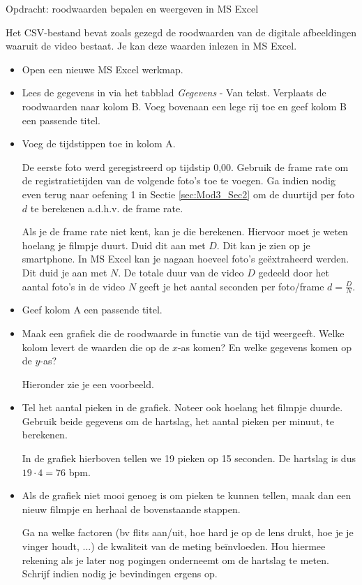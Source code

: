 \begin{opdracht}{Opdracht: roodwaarden bepalen en weergeven in MS Excel}
\begin{enumerate}
	Het CSV-bestand bevat zoals gezegd de roodwaarden van de digitale afbeeldingen waaruit de video bestaat. Je kan deze waarden inlezen in MS Excel. 
	
	\begin{itemize}
		\item Open een nieuwe MS Excel werkmap.
		\item Lees de gegevens in via het tabblad \emph{Gegevens} - Van tekst. Verplaats de roodwaarden naar kolom B. Voeg bovenaan een lege rij toe en geef kolom B een passende titel.
		\item Voeg de tijdstippen toe in kolom A. 
		
		De eerste foto werd geregistreerd op tijdstip 0,00. Gebruik de frame rate om de registratietijden van de volgende foto's toe te voegen. Ga indien nodig even terug naar oefening 1 in Sectie \ref{sec:Mod3_Sec2} om de duurtijd per foto $d$ te berekenen a.d.h.v. de frame rate.
		
		Als je de frame rate niet kent, kan je die berekenen. Hiervoor moet je weten hoelang je filmpje duurt. Duid dit aan met $D$. Dit kan je zien op je smartphone. In MS Excel kan je nagaan hoeveel foto's ge\"extraheerd werden. Dit duid je aan met $N$. De totale duur van de video $D$ gedeeld door het aantal foto's in de video $N$ geeft je het aantal seconden per foto/frame $d=\frac{D}{N}$. 
		
		\item Geef kolom A een passende titel.
		
		\item Maak een grafiek die de roodwaarde in functie van de tijd weergeeft. Welke kolom levert de waarden die op de $x$-as komen? En welke gegevens komen op de $y$-as?
		
		Hieronder zie je een voorbeeld.
		
		
		\item Tel het aantal pieken in de grafiek. Noteer ook hoelang het filmpje duurde. Gebruik beide gegevens om de hartslag, het aantal pieken per minuut, te berekenen.
		
		In de grafiek hierboven tellen we 19 pieken op 15 seconden. De hartslag is dus $19 \cdot 4 = 76$ bpm.
		
		\item Als de grafiek niet mooi genoeg is om pieken te kunnen tellen, maak dan een nieuw filmpje en herhaal de bovenstaande stappen. 
		
		Ga na welke factoren (bv flits aan/uit, hoe hard je op de lens drukt, hoe je je vinger houdt, ...) de kwaliteit van de meting be\"invloeden. Hou hiermee rekening als je later nog pogingen onderneemt om de hartslag te meten. Schrijf indien nodig je bevindingen ergens op.
	\end{itemize}	

\end{enumerate}
	
\end{opdracht}

